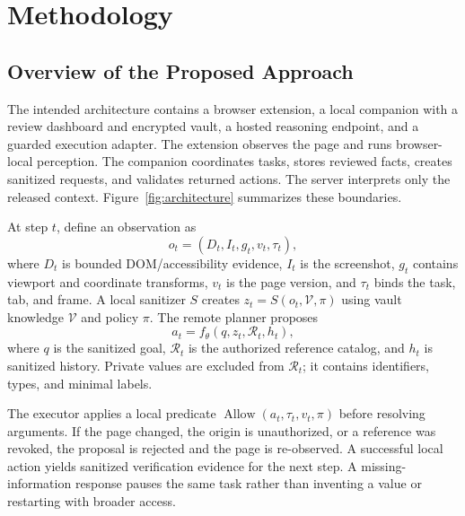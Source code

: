 \documentclass[conference]{IEEEtran}
\begin{document}
\section{Methodology}
\subsection{Overview of the Proposed Approach}
The intended architecture contains a browser extension, a local companion with a review dashboard and encrypted vault, a hosted reasoning endpoint, and a guarded execution adapter. The extension observes the page and runs browser-local perception. The companion coordinates tasks, stores reviewed facts, creates sanitized requests, and validates returned actions. The server interprets only the released context. Figure~\ref{fig:architecture} summarizes these boundaries.

At step $t$, define an observation as
\begin{equation}
 o_t=(D_t,I_t,g_t,v_t,\tau_t),
\end{equation}
where $D_t$ is bounded DOM/accessibility evidence, $I_t$ is the screenshot, $g_t$ contains viewport and coordinate transforms, $v_t$ is the page version, and $\tau_t$ binds the task, tab, and frame. A local sanitizer $S$ creates $z_t=S(o_t,\mathcal{V},\pi)$ using vault knowledge $\mathcal{V}$ and policy $\pi$. The remote planner proposes
\begin{equation}
 a_t=f_{\theta}(q,z_t,\mathcal{R}_t,h_t),
\end{equation}
where $q$ is the sanitized goal, $\mathcal{R}_t$ is the authorized reference catalog, and $h_t$ is sanitized history. Private values are excluded from $\mathcal{R}_t$; it contains identifiers, types, and minimal labels.

The executor applies a local predicate $\operatorname{Allow}(a_t,\tau_t,v_t,\pi)$ before resolving arguments. If the page changed, the origin is unauthorized, or a reference was revoked, the proposal is rejected and the page is re-observed. A successful local action yields sanitized verification evidence for the next step. A missing-information response pauses the same task rather than inventing a value or restarting with broader access.
\end{document}
